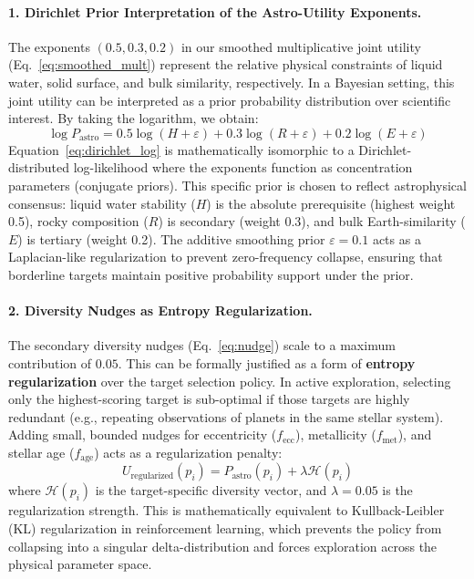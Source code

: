 \documentclass[11pt,a4paper]{article}
\begin{document}
\paragraph{1. Dirichlet Prior Interpretation of the Astro-Utility Exponents.}
The exponents $(0.5, 0.3, 0.2)$ in our smoothed multiplicative joint utility (Eq.~\ref{eq:smoothed_mult}) represent the relative physical constraints of liquid water, solid surface, and bulk similarity, respectively. In a Bayesian setting, this joint utility can be interpreted as a prior probability distribution over scientific interest. By taking the logarithm, we obtain:
\begin{equation}
\log P_{\text{astro}} = 0.5 \log(H + \varepsilon) + 0.3 \log(R + \varepsilon) + 0.2 \log(E + \varepsilon)
\label{eq:dirichlet_log}
\end{equation}
Equation~\ref{eq:dirichlet_log} is mathematically isomorphic to a Dirichlet-distributed log-likelihood where the exponents function as concentration parameters (conjugate priors). This specific prior is chosen to reflect astrophysical consensus: liquid water stability ($H$) is the absolute prerequisite (highest weight 0.5), rocky composition ($R$) is secondary (weight 0.3), and bulk Earth-similarity ($E$) is tertiary (weight 0.2). The additive smoothing prior $\varepsilon = 0.1$ acts as a Laplacian-like regularization to prevent zero-frequency collapse, ensuring that borderline targets maintain positive probability support under the prior.

\paragraph{2. Diversity Nudges as Entropy Regularization.}
The secondary diversity nudges (Eq.~\ref{eq:nudge}) scale to a maximum contribution of $0.05$. This can be formally justified as a form of \textbf{entropy regularization} over the target selection policy. In active exploration, selecting only the highest-scoring target is sub-optimal if those targets are highly redundant (e.g., repeating observations of planets in the same stellar system). Adding small, bounded nudges for eccentricity ($f_{\text{ecc}}$), metallicity ($f_{\text{met}}$), and stellar age ($f_{\text{age}}$) acts as a regularization penalty:
\begin{equation}
U_{\text{regularized}}(p_i) = P_{\text{astro}}(p_i) + \lambda \mathcal{H}(p_i)
\label{eq:entropy_reg}
\end{equation}
where $\mathcal{H}(p_i)$ is the target-specific diversity vector, and $\lambda = 0.05$ is the regularization strength. This is mathematically equivalent to Kullback-Leibler (KL) regularization in reinforcement learning, which prevents the policy from collapsing into a singular delta-distribution and forces exploration across the physical parameter space.
\end{document}
